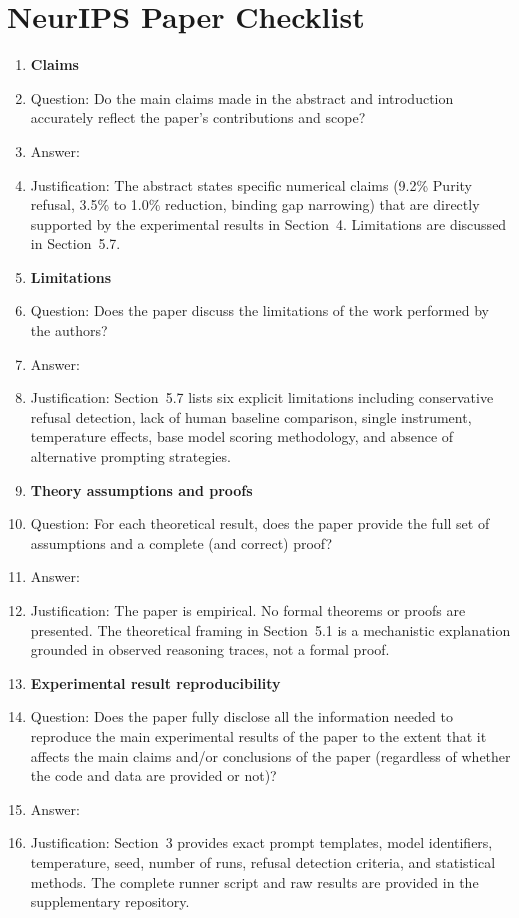 \section*{NeurIPS Paper Checklist}

\begin{enumerate}

\item {\bf Claims}
    \item[] Question: Do the main claims made in the abstract and introduction accurately reflect the paper's contributions and scope?
    \item[] Answer: \answerYes{}
    \item[] Justification: The abstract states specific numerical claims (9.2\% Purity refusal, 3.5\% to 1.0\% reduction, binding gap narrowing) that are directly supported by the experimental results in Section~4. Limitations are discussed in Section~5.7.

\item {\bf Limitations}
    \item[] Question: Does the paper discuss the limitations of the work performed by the authors?
    \item[] Answer: \answerYes{}
    \item[] Justification: Section~5.7 lists six explicit limitations including conservative refusal detection, lack of human baseline comparison, single instrument, temperature effects, base model scoring methodology, and absence of alternative prompting strategies.

\item {\bf Theory assumptions and proofs}
    \item[] Question: For each theoretical result, does the paper provide the full set of assumptions and a complete (and correct) proof?
    \item[] Answer: \answerNA{}
    \item[] Justification: The paper is empirical. No formal theorems or proofs are presented. The theoretical framing in Section~5.1 is a mechanistic explanation grounded in observed reasoning traces, not a formal proof.

    \item {\bf Experimental result reproducibility}
    \item[] Question: Does the paper fully disclose all the information needed to reproduce the main experimental results of the paper to the extent that it affects the main claims and/or conclusions of the paper (regardless of whether the code and data are provided or not)?
    \item[] Answer: \answerYes{}
    \item[] Justification: Section~3 provides exact prompt templates, model identifiers, temperature, seed, number of runs, refusal detection criteria, and statistical methods. The complete runner script and raw results are provided in the supplementary repository.


\end{enumerate}

